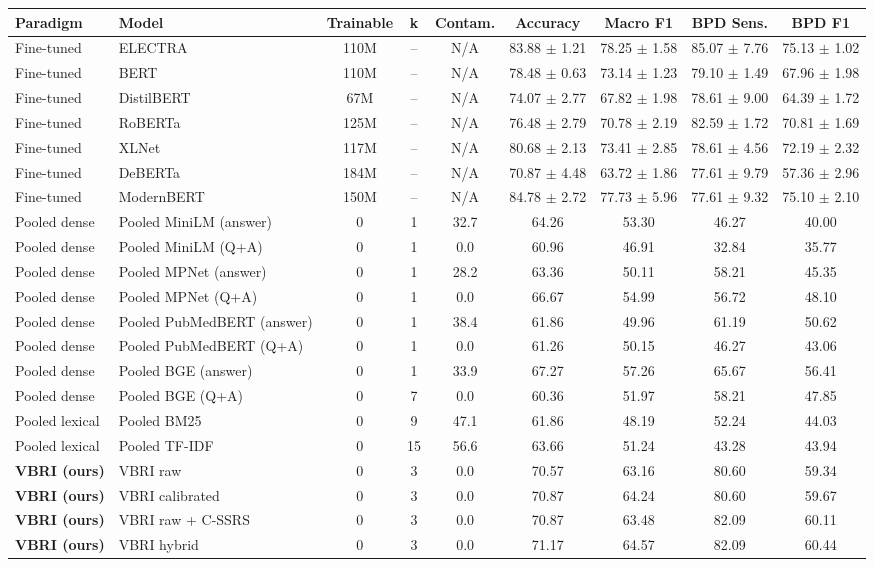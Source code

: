 \begin{tabular}{@{}llccccccc@{}}
\toprule
\textbf{Paradigm} & \textbf{Model} & \textbf{Trainable} & \textbf{k} & \textbf{Contam.} & \textbf{Accuracy} & \textbf{Macro F1} & \textbf{BPD Sens.} & \textbf{BPD F1} \\
\midrule
Fine-tuned & ELECTRA & 110M & -- & N/A & 83.88 $\pm$ 1.21 & 78.25 $\pm$ 1.58 & 85.07 $\pm$ 7.76 & 75.13 $\pm$ 1.02 \\
Fine-tuned & BERT & 110M & -- & N/A & 78.48 $\pm$ 0.63 & 73.14 $\pm$ 1.23 & 79.10 $\pm$ 1.49 & 67.96 $\pm$ 1.98 \\
Fine-tuned & DistilBERT & 67M & -- & N/A & 74.07 $\pm$ 2.77 & 67.82 $\pm$ 1.98 & 78.61 $\pm$ 9.00 & 64.39 $\pm$ 1.72 \\
Fine-tuned & RoBERTa & 125M & -- & N/A & 76.48 $\pm$ 2.79 & 70.78 $\pm$ 2.19 & 82.59 $\pm$ 1.72 & 70.81 $\pm$ 1.69 \\
Fine-tuned & XLNet & 117M & -- & N/A & 80.68 $\pm$ 2.13 & 73.41 $\pm$ 2.85 & 78.61 $\pm$ 4.56 & 72.19 $\pm$ 2.32 \\
Fine-tuned & DeBERTa & 184M & -- & N/A & 70.87 $\pm$ 4.48 & 63.72 $\pm$ 1.86 & 77.61 $\pm$ 9.79 & 57.36 $\pm$ 2.96 \\
Fine-tuned & ModernBERT & 150M & -- & N/A & 84.78 $\pm$ 2.72 & 77.73 $\pm$ 5.96 & 77.61 $\pm$ 9.32 & 75.10 $\pm$ 2.10 \\
\midrule
Pooled dense & Pooled MiniLM (answer) & 0 & 1 & 32.7 & 64.26 & 53.30 & 46.27 & 40.00 \\
Pooled dense & Pooled MiniLM (Q+A) & 0 & 1 & 0.0 & 60.96 & 46.91 & 32.84 & 35.77 \\
Pooled dense & Pooled MPNet (answer) & 0 & 1 & 28.2 & 63.36 & 50.11 & 58.21 & 45.35 \\
Pooled dense & Pooled MPNet (Q+A) & 0 & 1 & 0.0 & 66.67 & 54.99 & 56.72 & 48.10 \\
Pooled dense & Pooled PubMedBERT (answer) & 0 & 1 & 38.4 & 61.86 & 49.96 & 61.19 & 50.62 \\
Pooled dense & Pooled PubMedBERT (Q+A) & 0 & 1 & 0.0 & 61.26 & 50.15 & 46.27 & 43.06 \\
Pooled dense & Pooled BGE (answer) & 0 & 1 & 33.9 & 67.27 & 57.26 & 65.67 & 56.41 \\
Pooled dense & Pooled BGE (Q+A) & 0 & 7 & 0.0 & 60.36 & 51.97 & 58.21 & 47.85 \\
\midrule
Pooled lexical & Pooled BM25 & 0 & 9 & 47.1 & 61.86 & 48.19 & 52.24 & 44.03 \\
Pooled lexical & Pooled TF-IDF & 0 & 15 & 56.6 & 63.66 & 51.24 & 43.28 & 43.94 \\
\midrule
\textbf{VBRI (ours)} & VBRI raw & 0 & 3 & 0.0 & 70.57 & 63.16 & 80.60 & 59.34 \\
\textbf{VBRI (ours)} & VBRI calibrated & 0 & 3 & 0.0 & 70.87 & 64.24 & 80.60 & 59.67 \\
\textbf{VBRI (ours)} & VBRI raw + C-SSRS & 0 & 3 & 0.0 & 70.87 & 63.48 & 82.09 & 60.11 \\
\textbf{VBRI (ours)} & VBRI hybrid & 0 & 3 & 0.0 & 71.17 & 64.57 & 82.09 & 60.44 \\
\bottomrule
\end{tabular}
